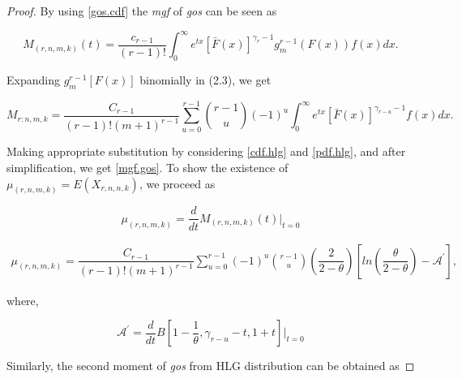 \documentclass[11pt,a4paper]{article}
\numberwithin{equation}{section}
\begin{document}
	\begin{proof}

		By using \eqref{gos.cdf} the \textit{mgf} of \textit{gos} can be seen as

		\begin{equation} 

			M_{(r,n,m,k)}(t)=\frac{c_{r-1}}{(r-1)!}\int_{0}^\infty e^{tx}\left[\bar{F}\left(x\right)\right]^{\gamma _{r} -1} g_{m}^{r-1} \left(F\left(x\right)\right)f\left(x\right)dx.

		\end{equation}

		Expanding $g_{m}^{r-1}[F(x)]$ binomially in (2.3), we get

		\begin{equation} 

			M_{r:n,m,k} =\frac{C_{r-1} }{\left(r-1\right)!(m+1)^{r-1} }  \sum_{u=0}^{r-1}\binom{r-1}{u}(-1)^{u} \int _{0}^{\infty }e^{tx} \left[\bar{F}\left(x\right)\right]^{\gamma _{r-u} -1} f\left(x\right)dx  .  

		\end{equation}

		Making appropriate substitution by considering \eqref{cdf.hlg} and \eqref{pdf.hlg}, and after simplification, we get \eqref{mgf.gos}. To show the existence of $\mu_{(r,n,m,k)}=E\left(X_{r,n,n,k}\right)$, we proceed as

		\begin{equation}

			\mu_{(r,n,m,k)}=\frac{d}{dt}M_{(r,n,m,k)}(t)\Bigg|_{t=0}\nonumber

		\end{equation}

		\begin{eqnarray}\label{momet1.gos}

			\mu_{(r,n,m,k)}=\dfrac{C_{r-1}}{(r-1)!(m+1)^{r-1}}\sum_{u=0}^{r-1}(-1)^{u}\binom{r-1}{u}\left(\dfrac{2}{2-\theta}\right) \left[ln\left(\dfrac{\theta}{2-\theta}\right)-\mathcal{A}^{'}\right],

		\end{eqnarray} 

		where,

		\begin{equation}

			\mathcal{A}^{'}={\frac{d}{dt}}B\left[1-\frac{1}{\theta},\gamma_{r-u}-t,1+t\right]\Bigg|_{t=0}\nonumber

		\end{equation}

		Similarly, the second moment of \textit{gos} from HLG distribution can be obtained as


\end{proof}
\end{document}
